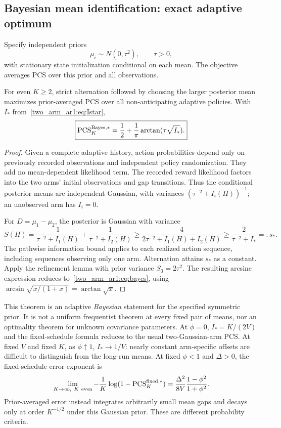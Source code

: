 \subsection{Bayesian mean identification: exact adaptive optimum}
Specify independent priors
\begin{equation}
\mu_i\sim N(0,\tau^2),\qquad \tau>0,
\end{equation}
with stationary state initialization conditional on each mean. The objective averages PCS over this prior and all observations.

\begin{theorem}
For even $K\geq2$, strict alternation followed by choosing the larger posterior mean maximizes prior-averaged PCS over all non-anticipating adaptive policies. With $I_*$ from~\eqref{two_arm_ar1:eq:Istar},
\begin{equation}
\boxed{\operatorname{PCS}_K^{\mathrm{Bayes},*}
=\frac12+\frac1\pi\arctan(\tau\sqrt{I_*}).}
\label{two_arm_ar1:eq:bayes}
\end{equation}
\end{theorem}
\begin{proof}
Given a complete adaptive history, action probabilities depend only on previously recorded observations and independent policy randomization. They add no mean-dependent likelihood term. The recorded reward likelihood factors into the two arms' initial observations and gap transitions. Thus the conditional posterior means are independent Gaussian, with variances $(\tau^{-2}+I_i(H))^{-1}$; an unobserved arm has $I_i=0$.

For $D=\mu_1-\mu_2$, the posterior is Gaussian with variance
\[
S(H)=\frac1{\tau^{-2}+I_1(H)}+
\frac1{\tau^{-2}+I_2(H)}
\geq\frac4{2\tau^{-2}+I_1(H)+I_2(H)}
\geq\frac2{\tau^{-2}+I_*}=:s_*.
\]
The pathwise information bound applies to each realized action sequence, including sequences observing only one arm. Alternation attains $s_*$ as a constant. Apply the refinement lemma with prior variance $S_0=2\tau^2$. The resulting arcsine expression reduces to~\eqref{two_arm_ar1:eq:bayes}, using
$\arcsin\sqrt{x/(1+x)}=\arctan\sqrt x$.
\end{proof}

This theorem is an adaptive \emph{Bayesian} statement for the specified symmetric prior. It is not a uniform frequentist theorem at every fixed pair of means, nor an optimality theorem for unknown covariance parameters. At $\phi=0$, $I_*=K/(2V)$ and the fixed-schedule formula reduces to the usual two-Gaussian-arm PCS. At fixed $V$ and fixed $K$, as $\phi\uparrow1$, $I_*\to1/V$: nearly constant arm-specific offsets are difficult to distinguish from the long-run means. At fixed $\phi<1$ and $\Delta>0$, the fixed-schedule error exponent is
\begin{equation}
\lim_{K\to\infty,\ K\ \mathrm{even}}-
\frac1K\log(1-\operatorname{PCS}_K^{\mathrm{fixed},*})
=\frac{\Delta^2}{8V}\frac{1-\phi^2}{1+\phi^2}.
\end{equation}
Prior-averaged error instead integrates arbitrarily small mean gaps and decays only at order $K^{-1/2}$ under this Gaussian prior. These are different probability criteria.

